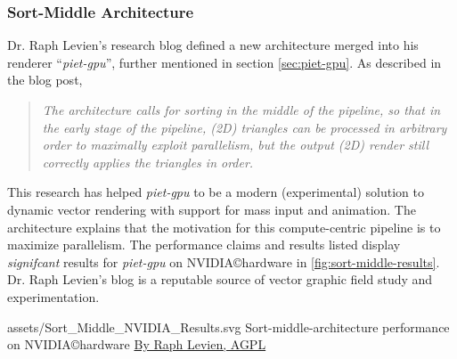 \subsubsection{Sort-Middle Architecture}\cite{Levien20}
Dr. Raph Levien's research blog defined a new architecture merged into his renderer ``\textit{piet-gpu}'', further mentioned in section \cref{sec:piet-gpu}. As described in the blog post,
\begin{quote}
\textit{The architecture calls for sorting in the middle of the pipeline, so that in the early stage of the pipeline, (2D) triangles can be processed in arbitrary order to maximally exploit parallelism, but the output (2D) render still correctly applies the triangles in order.}\cite{Levien20}
\end{quote}
This research has helped \textit{piet-gpu} to be a modern (experimental) solution to dynamic vector rendering with support for mass input and animation. The architecture explains that the motivation for this compute-centric pipeline is to maximize parallelism. The performance claims and results listed display \emph{signifcant} results for \textit{piet-gpu} on NVIDIA\copyright hardware in \cref{fig:sort-middle-results}. Dr. Raph Levien's blog is a reputable source of vector graphic field study and experimentation.\medskip

\widesvg
{assets/Sort_Middle_NVIDIA_Results.svg}
{Sort-middle-architecture performance on NVIDIA\copyright hardware\label{fig:sort-middle-results}}
{\href{http://www.gnu.org/licenses/agpl.html}{By Raph Levien, AGPL}}\medskip

